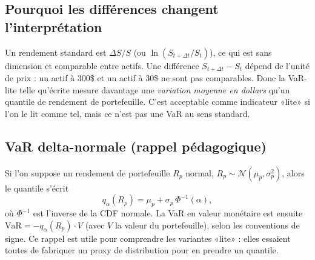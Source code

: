 \documentclass[11pt,a4paper]{report}
\theoremstyle{definition}
\theoremstyle{plain}
\theoremstyle{remark}
\newcommand{\1}{\mathbf{1}}
\newcommand{\Normal}{\mathcal{N}}
\begin{document}
\subsection*{Pourquoi les différences changent l'interprétation}
Un rendement standard est $\Delta S / S$ (ou $\ln(S_{t+\Delta t}/S_t)$), ce qui est sans dimension et comparable entre actifs.
Une différence $S_{t+\Delta t}-S_t$ dépend de l'unité de prix : un actif à 300\$ et un actif à 30\$ ne sont pas comparables.
Donc la VaR-lite telle qu'écrite mesure davantage une \emph{variation moyenne en dollars} qu'un quantile de rendement de portefeuille.
C'est acceptable comme indicateur «lite» si l'on le lit comme tel, mais ce n'est pas une VaR au sens standard.

\subsection*{VaR delta-normale (rappel pédagogique)}
Si l'on suppose un rendement de portefeuille $R_p$ normal, $R_p\sim\Normal(\mu_p,\sigma_p^2)$, alors le quantile s'écrit
\[
q_\alpha(R_p)=\mu_p+\sigma_p\,\Phi^{-1}(\alpha),
\]
où $\Phi^{-1}$ est l'inverse de la CDF normale.
La VaR en valeur monétaire est ensuite $\mathrm{VaR}= -q_\alpha(R_p)\cdot V$ (avec $V$ la valeur du portefeuille), selon les conventions de signe.
Ce rappel est utile pour comprendre les variantes «lite» : elles essaient toutes de fabriquer un proxy de distribution pour en prendre un quantile.
\end{document}
